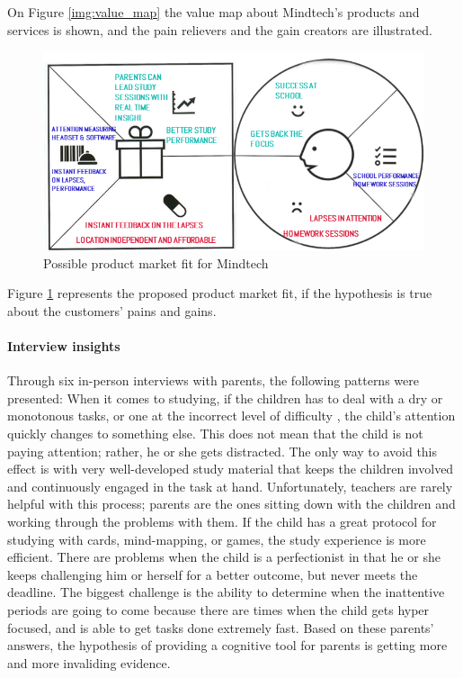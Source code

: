 \documentclass[letterpaper,10pt]{article}
\begin{document}
On Figure \ref{img:value_map} the value map about Mindtech's products and services is shown, and the pain relievers and the gain creators are illustrated.   

\begin{figure}[!htb]
\centering
\includegraphics[scale=0.5]{fit.PNG}
\caption{Possible product market fit for Mindtech}
\label{img:prod_market_fit}
\end{figure}

Figure \ref{img:prod_market_fit} represents the proposed product market fit, if the hypothesis is true about the customers’ pains and gains.


\paragraph{Interview insights}

Through six in-person interviews with parents, the following patterns were presented: When it comes to studying, if the children has to deal with a dry or monotonous tasks, or one at the incorrect level of difficulty , the child's attention quickly changes to something else. This does not mean that the child is not paying attention; rather,  he or she gets distracted. The only way to avoid this effect is with very well-developed study material that keeps the children involved and continuously engaged in the task at hand. Unfortunately, teachers are rarely helpful with this process; parents are the ones sitting down with the children and working through the problems with them. If the child has a great protocol for studying with cards, mind-mapping, or games, the study experience is more efficient. 
There are problems when the child is a perfectionist in that he or she keeps challenging him or herself for a better outcome, but never meets the deadline. The biggest challenge is the ability to determine when the inattentive periods are going to come because there are times when the child gets hyper focused, and is able to get tasks done extremely fast.
Based on these parents’ answers, the hypothesis of providing a cognitive tool for parents is getting more and more invaliding evidence.
\end{document}
